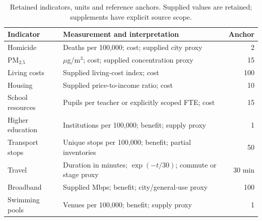 \begin{table}[htbp]\centering
\caption{Retained indicators, units and reference anchors. Supplied values are retained; supplements have explicit source scope.}\label{tab:indicators}
\begin{tabular}{p{.22\linewidth}p{.56\linewidth}r}
\toprule Indicator & Measurement and interpretation & Anchor\\\midrule
Homicide & Deaths per 100,000; cost; supplied city proxy & 2 \\
PM$_{2.5}$ & $\mu$g/m$^3$; cost; supplied concentration proxy & 15 \\
Living costs & Supplied living-cost index; cost & 100 \\
Housing & Supplied price-to-income ratio; cost & 10 \\
School resources & Pupils per teacher or explicitly scoped FTE; cost & 15 \\
Higher education & Institutions per 100,000; benefit; supply proxy & 1 \\
Transport stops & Unique stops per 100,000; benefit; partial inventories & 50 \\
Travel & Duration in minutes; $\exp(-t/30)$; commute or stage proxy & 30 min \\
Broadband & Supplied Mbps; benefit; city/general-use proxy & 100 \\
Swimming pools & Venues per 100,000; benefit; supply proxy & 1 \\
\bottomrule
\end{tabular}
\end{table}
